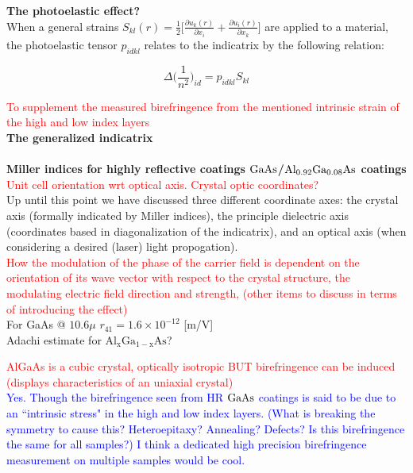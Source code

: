 \noindent \textbf{The photoelastic effect?}
\\
When a general strains $S_{kl}(r) = \frac{1}{2} \bigg[ \frac{\partial u_k (r)}{\partial x_i} + \frac{\partial u_i (r)}{\partial x_k} \bigg]$ are applied to a material, the photoelastic tensor $p_{idkl}$ relates to the indicatrix by the following relation:

\begin{equation}
\Delta \bigg( \frac{1}{n^2} \bigg)_{id} = p_{idkl} S_{kl}
\end{equation}

\textcolor{red}{To supplement the measured birefringence from the mentioned intrinsic strain of the high and low index layers}
\\
\noindent \textbf{The generalized indicatrix}
\\
\\
\noindent \textbf{Miller indices for highly reflective coatings $\mathrm{GaAs}$/$\mathrm{Al_{0.92}Ga_{0.08}As}$ coatings}
\\
\textcolor{red}{Unit cell orientation wrt optical axis. Crystal optic coordinates?}
\\
Up until this point we have discussed three different coordinate axes: the crystal axis (formally indicated by Miller indices), the principle dielectric axis (coordinates based in diagonalization of the indicatrix), and an optical axis (when considering a desired (laser) light propogation).
\\
\textcolor{red}{How the modulation of the phase of the carrier field is dependent on the orientation of its wave vector with respect to the crystal structure, the modulating electric field direction and strength, (other items to discuss in terms of introducing the effect)}
\\
For GaAs @ $10.6\mu$ $r_{41} = 1.6 \times 10^{-12}$ [m/V]
\\
Adachi estimate for $\mathrm{Al_{x}Ga_{1-x}As}$?

\textcolor{red}{AlGaAs is a cubic crystal, optically isotropic BUT birefringence can be induced (displays characteristics of an uniaxial crystal)}
\\
 \textcolor{blue}{Yes. Though the birefringence seen from HR $\mathrm{GaAs}$ coatings is said to be due to an ``intrinsic stress" in the high and low index layers. (What is breaking the symmetry to cause this? Heteroepitaxy? Annealing? Defects? Is this birefringence the same for all samples?) I think a dedicated high precision birefringence measurement on multiple samples would be cool.}

